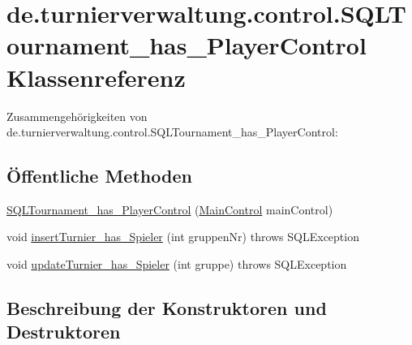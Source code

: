 \hypertarget{classde_1_1turnierverwaltung_1_1control_1_1_s_q_l_tournament__has___player_control}{}\section{de.\+turnierverwaltung.\+control.\+S\+Q\+L\+Tournament\+\_\+has\+\_\+\+Player\+Control Klassenreferenz}
\label{classde_1_1turnierverwaltung_1_1control_1_1_s_q_l_tournament__has___player_control}


Zusammengehörigkeiten von de.\+turnierverwaltung.\+control.\+S\+Q\+L\+Tournament\+\_\+has\+\_\+\+Player\+Control\+:
\subsection*{Öffentliche Methoden}
\begin{DoxyCompactItemize}
\item 
\hyperlink{classde_1_1turnierverwaltung_1_1control_1_1_s_q_l_tournament__has___player_control_a2a8182450473a7ac60cf558af05d24de}{S\+Q\+L\+Tournament\+\_\+has\+\_\+\+Player\+Control} (\hyperlink{classde_1_1turnierverwaltung_1_1control_1_1_main_control}{Main\+Control} main\+Control)
\item 
void \hyperlink{classde_1_1turnierverwaltung_1_1control_1_1_s_q_l_tournament__has___player_control_add8d0ecb07bcadbfc07b0e33bb9dc070}{insert\+Turnier\+\_\+has\+\_\+\+Spieler} (int gruppen\+Nr)  throws S\+Q\+L\+Exception 
\item 
void \hyperlink{classde_1_1turnierverwaltung_1_1control_1_1_s_q_l_tournament__has___player_control_af9b24b95f80c7767207d52f4c15ecb70}{update\+Turnier\+\_\+has\+\_\+\+Spieler} (int gruppe)  throws S\+Q\+L\+Exception 
\end{DoxyCompactItemize}


\subsection{Beschreibung der Konstruktoren und Destruktoren}

